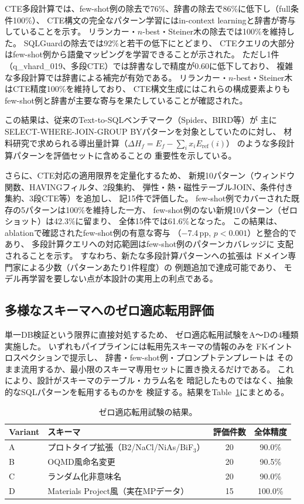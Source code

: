 \documentclass[5p,twocolumn]{elsarticle}
\begin{document}
CTE多段計算では、few-shot例の除去で76\%、辞書の除去で86\%に低下し（full条件100\%）、
CTE構文の完全なパターン学習にはin-context learningと辞書が寄与していることを示す。
リランカー・$n$-best・Steiner木の除去では100\%を維持した。
SQLGuardの除去では92\%と若干の低下にとどまり、
CTEクエリの大部分はfew-shot例から語彙マッピングを学習できることが示された。
ただし1件（q\_vhard\_019、多段CTE）では辞書なしで精度が0.60に低下しており、
複雑な多段計算では辞書による補完が有効である。
リランカー・$n$-best・Steiner木はCTE精度100\%を維持しており、
CTE構文生成にはこれらの構成要素よりも
few-shot例と辞書が主要な寄与を果たしていることが確認された。

この結果は、従来のText-to-SQLベンチマーク（Spider、BIRD等）が
主にSELECT-WHERE-JOIN-GROUP BYパターンを対象としていたのに対し、
材料研究で求められる導出量計算（$\Delta H_f = E_f - \sum_i x_i E_{\mathrm{ref}}(i)$）
のような多段計算パターンを評価セットに含めることの
重要性を示している。

さらに、CTE対応の適用限界を定量化するため、
新規10パターン（ウィンドウ関数、HAVINGフィルタ、2段集約、
弾性・熱・磁性テーブルJOIN、条件付き集約、3段CTE等）を追加し、
記15件で評価した。
few-shot例でカバーされた既存の5パターンは100\%を維持した一方、
few-shot例のない新規10パターン（ゼロショット）は42.3\%に留まり、
全体15件では61.6\%となった。
この結果は、ablationで確認されたfew-shot例の有意な寄与
（$-$7.4\,pp, $p<0.001$）と整合的であり、
多段計算クエリへの対応範囲はfew-shot例のパターンカバレッジに
支配されることを示す。
すなわち、新たな多段計算パターンへの拡張は
ドメイン専門家による少数（パターンあたり1件程度）の
例題追加で達成可能であり、
モデル再学習を要しない点が本設計の実用上の利点である。

\subsection{多様なスキーマへのゼロ適応転用評価}
\label{sec:transfer_eval}

単一DB検証という限界に直接対処するため、
ゼロ適応転用試験をA〜Dの4種類実施した。
いずれもパイプラインには転用先スキーマの情報のみを
FKイントロスペクションで提示し、
辞書・few-shot例・プロンプトテンプレートは
そのまま流用するか、最小限のスキーマ専用セットに置き換えるだけである。
これにより、設計がスキーマのテーブル・カラム名を
暗記したものではなく、抽象的なSQLパターンを転用するものかを
検証する。結果をTable~\ref{tab:transfer_eval}にまとめる。

\begin{table}[t]
\centering
\caption{ゼロ適応転用試験の結果。}
\label{tab:transfer_eval}
\begin{tabular}{@{}llcc@{}}
\toprule
Variant & スキーマ & 評価件数 & 全体精度 \\ \midrule
A & プロトタイプ拡張（B2/NaCl/NiAs/BiF$_3$） & 20 & 90.0\% \\
B & OQMD風命名変更 & 20 & 90.5\% \\
C & ランダム化非意味名 & 20 & 90.0\% \\
D & Materials Project風（実在MPデータ） & 15 & 100.0\% \\
\bottomrule
\end{tabular}
\end{table}
\end{document}
